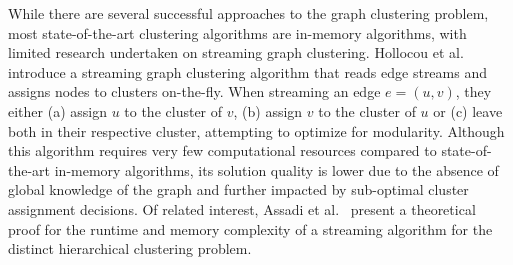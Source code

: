 While there are several successful approaches to the graph clustering problem, most state-of-the-art clustering algorithms are in-memory algorithms, with limited research undertaken on streaming graph clustering. Hollocou et al.~\cite{hollocou} introduce a streaming graph clustering algorithm that reads edge streams and assigns nodes to clusters on-the-fly. When streaming an edge $e=(u,v)$, they either (a) assign $u$ to the cluster of $v$, (b) assign $v$ to the cluster of $u$ or (c) leave both in their respective cluster, attempting to optimize for modularity. Although this algorithm requires very few computational resources compared to state-of-the-art in-memory algorithms, its solution quality is lower due to the absence of global knowledge of the graph and further impacted by sub-optimal cluster assignment decisions. Of related interest, Assadi et al.~\cite{assadi2022hierarchical} present a theoretical proof for the runtime and memory complexity of a streaming algorithm for the distinct hierarchical clustering problem.